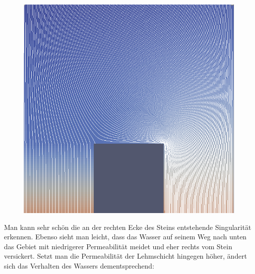 \begin{figure}[H]
	\centering
	
	\includegraphics[width=\textwidth]{../../19/StreamLinesgemfem.png}
	
\end{figure}
Man kann sehr schön die an der rechten Ecke des Steins entstehende Singularität erkennen. Ebenso sieht man leicht, dass das Wasser auf seinem Weg nach unten das Gebiet mit niedrigerer Permeabilität meidet und eher rechts vom Stein versickert. 
Setzt man die Permeabilität der Lehmschicht hingegen höher,
ändert sich das Verhalten des Wassers dementsprechend:
